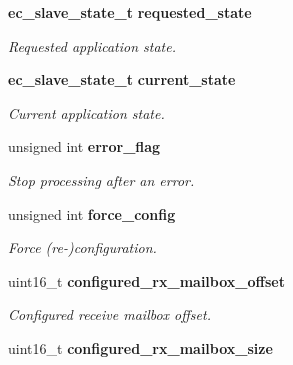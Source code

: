 \begin{DoxyCompactItemize}
{\bf ec\-\_\-slave\-\_\-state\-\_\-t} {\bf requested\-\_\-state}
\begin{DoxyCompactList}\small\item\em \-Requested application state. \end{DoxyCompactList}\item 
{\bf ec\-\_\-slave\-\_\-state\-\_\-t} {\bf current\-\_\-state}
\begin{DoxyCompactList}\small\item\em \-Current application state. \end{DoxyCompactList}\item 
unsigned int {\bf error\-\_\-flag}
\begin{DoxyCompactList}\small\item\em \-Stop processing after an error. \end{DoxyCompactList}\item 
unsigned int {\bf force\-\_\-config}
\begin{DoxyCompactList}\small\item\em \-Force (re-\/)configuration. \end{DoxyCompactList}\item 
uint16\-\_\-t {\bf configured\-\_\-rx\-\_\-mailbox\-\_\-offset}
\begin{DoxyCompactList}\small\item\em \-Configured receive mailbox offset. \end{DoxyCompactList}\item 
uint16\-\_\-t {\bf configured\-\_\-rx\-\_\-mailbox\-\_\-size}\label{structec__slave_a0310afbbf38da2a92cdbe3911a46535c}


\end{DoxyCompactItemize}

